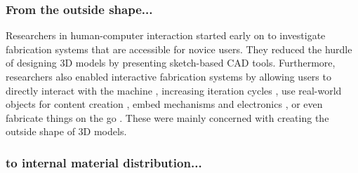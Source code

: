 



\subsubsection{From the outside shape...}

Researchers in human-computer interaction started early on to investigate fabrication systems that are accessible for novice users. They reduced the hurdle of designing 3D models by presenting sketch-based CAD tools. Furthermore, researchers also enabled interactive fabrication systems by allowing users to directly interact with the machine \cite{Willis2011a, Mueller2012a, Peng2016}, increasing iteration cycles \cite{Mueller2014, Mueller2014a}, use real-world objects for content creation \cite{Weichel2014, Weichel2015}, embed mechanisms \cite{Zhang2017} and electronics \cite{Weichel2013, Ledo2017}, or even fabricate things on the go \cite{Roumen2016}. These were mainly concerned with creating the outside shape of 3D models.


\subsubsection{to internal material distribution...}

